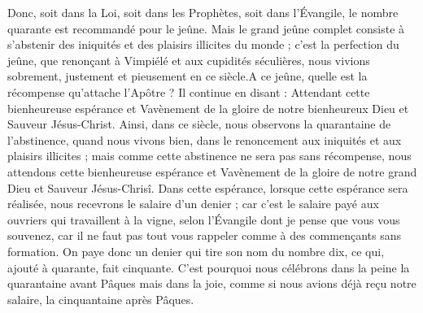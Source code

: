 Donc, soit dans la Loi, soit dans les Prophètes, soit dans l’Évangile, le nombre quarante est recommandé pour le jeûne. Mais le grand jeûne complet consiste à s’abstenir des iniquités et des plaisirs illicites du monde ; c’est la perfection du jeûne, que renonçant à Vimpiélé et aux cupidités séculières, nous vivions sobrement, justement et pieusement en ce siècle.A ce jeûne, quelle est la récompense qu’attache l’Apôtre ? Il continue en disant : Attendant cette bienheureuse espérance et Vavènement de la gloire de notre bienheureux Dieu et Sauveur Jésus-Christ. Ainsi, dans ce siècle, nous observons la quarantaine de l’abstinence, quand nous vivons bien, dans le renoncement aux iniquités et aux plaisirs illicites ; mais comme cette abstinence ne sera pas sans récompense, nous attendons cette bienheureuse espérance et Vavènement de la gloire de notre grand Dieu et Sauveur Jésus-Chrisî. Dans cette espérance, lorsque cette espérance sera réalisée, nous recevrons le salaire d'un denier ; car c'est le salaire payé aux ouvriers qui travaillent à la vigne, selon l'Évangile dont je pense que vous vous souvenez, car il ne faut pas tout vous rappeler comme à des commençants sans formation. On paye donc un denier qui tire son nom du nombre dix, ce qui, ajouté à quarante, fait cinquante. C’est pourquoi nous célébrons dans la peine la quarantaine avant Pâques mais dans la joie, comme si nous avions déjà reçu notre salaire, la cinquantaine après Pâques.
